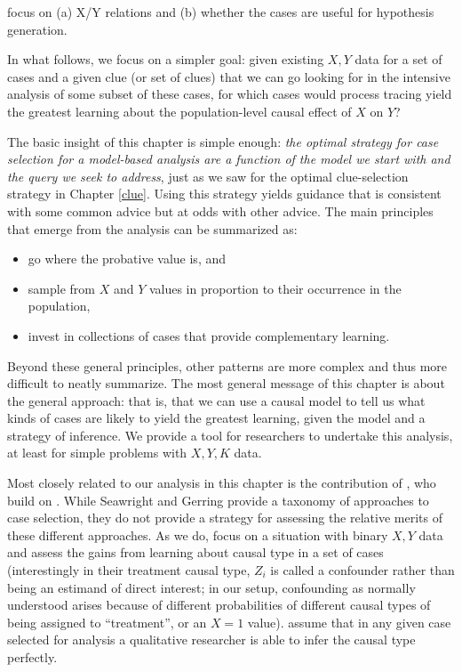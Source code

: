 \documentclass[
  12pt,
]{book}
\providecommand{\tightlist}{%
  \setlength{\itemsep}{0pt}\setlength{\parskip}{0pt}}
\begin{document}
\citet{weller2014finding} focus on (a) X/Y relations and (b) whether the cases are useful for hypothesis generation.

In what follows, we focus on a simpler goal: given existing \(X, Y\) data for a set of cases and a given clue (or set of clues) that we can go looking for in the intensive analysis of some subset of these cases, for which cases would process tracing yield the greatest learning about the population-level causal effect of \(X\) on \(Y\)?

The basic insight of this chapter is simple enough: \emph{the optimal strategy for case selection for a model-based analysis are a function of the model we start with and the query we seek to address}, just as we saw for the optimal clue-selection strategy in Chapter \ref{clue}. Using this strategy yields guidance that is consistent with some common advice but at odds with other advice. The main principles that emerge from the analysis can be summarized as:

\begin{itemize}
\tightlist
\item
  go where the probative value is, and
\item
  sample from \(X\) and \(Y\) values in proportion to their occurrence in the population,
\item
  invest in collections of cases that provide complementary learning.
\end{itemize}

Beyond these general principles, other patterns are more complex and thus more difficult to neatly summarize. The most general message of this chapter is about the general approach: that is, that we can use a causal model to tell us what kinds of cases are likely to yield the greatest learning, given the model and a strategy of inference. We provide a tool for researchers to undertake this analysis, at least for simple problems with \(X, Y, K\) data.

Most closely related to our analysis in this chapter is the contribution of \citet{HerronQuinn}, who build on \citet{SeawrightGerring2008}. While Seawright and Gerring provide a taxonomy of approaches to case selection, they do not provide a strategy for assessing the relative merits of these different approaches. As we do, \citet{HerronQuinn} focus on a situation with binary \(X,Y\) data and assess the gains from learning about causal type in a set of cases (interestingly in their treatment causal type, \(Z_i\) is called a confounder rather than being an estimand of direct interest; in our setup, confounding as normally understood arises because of different probabilities of different causal types of being assigned to ``treatment'', or an \(X=1\) value). \citet{HerronQuinn} assume that in any given case selected for analysis a qualitative researcher is able to infer the causal type perfectly.
\end{document}

